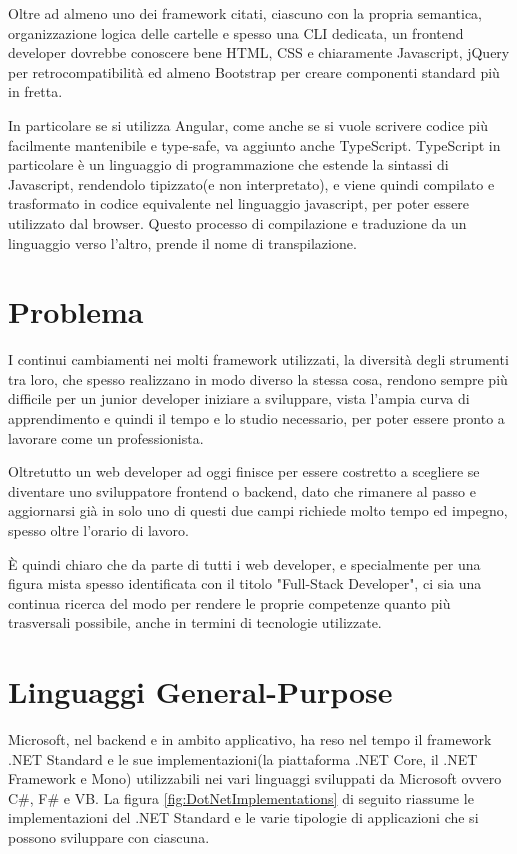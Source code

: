 Oltre ad almeno uno dei framework citati, ciascuno con la propria semantica, organizzazione logica delle cartelle e spesso una CLI dedicata, un frontend developer dovrebbe conoscere bene HTML, CSS e chiaramente Javascript, jQuery per retrocompatibilit\`a ed almeno Bootstrap per creare componenti standard pi\`u in fretta.

In particolare se si utilizza Angular, come anche se si vuole scrivere codice pi\`u facilmente mantenibile e type-safe, va aggiunto anche TypeScript.
TypeScript in particolare \`e un linguaggio di programmazione che estende la sintassi di Javascript, rendendolo tipizzato(e non interpretato), e viene quindi compilato e trasformato in codice equivalente nel linguaggio javascript, per poter essere utilizzato dal browser.
Questo processo di compilazione e traduzione da un linguaggio verso l'altro, prende il nome di transpilazione.

\section{Problema}\label{sez:problema}
I continui cambiamenti nei molti framework utilizzati, la diversit\`a degli strumenti tra loro, che spesso realizzano in modo diverso la stessa cosa, rendono sempre pi\`u difficile per un junior developer iniziare a sviluppare, vista l'ampia curva di apprendimento e quindi il tempo e lo studio necessario, per poter essere pronto a lavorare come un professionista.

Oltretutto un web developer ad oggi finisce per essere costretto a scegliere se diventare uno sviluppatore frontend o backend, dato che rimanere al passo e aggiornarsi gi\`a in solo uno di questi due campi richiede molto tempo ed impegno, spesso oltre l'orario di lavoro.

\`E quindi chiaro che da parte di tutti i web developer, e specialmente per una figura mista spesso identificata con il titolo "Full-Stack Developer", ci sia una continua ricerca del modo per rendere le proprie competenze quanto pi\`u trasversali possibile, anche in termini di tecnologie utilizzate.

\pagebreak

\section{Linguaggi General-Purpose}\label{sez:linguaggiGeneralPurpose}
Microsoft, nel backend e in ambito applicativo, ha reso nel tempo il framework .NET Standard e le sue implementazioni(la piattaforma .NET Core, il .NET Framework e Mono) utilizzabili nei vari linguaggi sviluppati da Microsoft ovvero C\#, F\# e VB.
La figura \ref{fig:DotNetImplementations} di seguito riassume le implementazioni del .NET Standard e le varie tipologie di applicazioni che si possono sviluppare con ciascuna.

